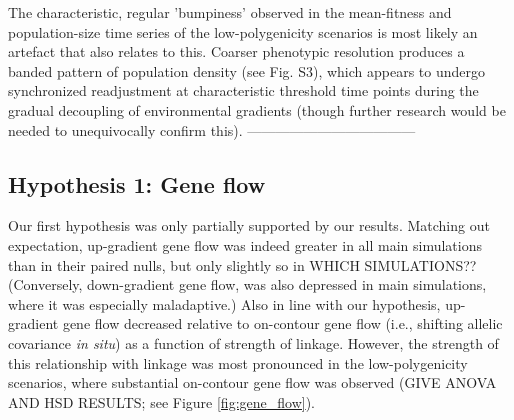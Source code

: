 \documentclass[9pt,twocolumn,twoside,lineno]{pnas-new}
\begin{document}
The characteristic, regular 'bumpiness' observed in the mean-fitness and population-size
time series of the low-polygenicity scenarios is most likely an artefact that also relates to this.
Coarser phenotypic resolution produces a banded pattern of population density
(see Fig. S3), which appears to undergo synchronized readjustment
at characteristic threshold time points during the gradual decoupling
of environmental gradients
(though further research would be needed to unequivocally confirm this).
------------------------------------




\subsection{Hypothesis 1: Gene flow}
Our first hypothesis was only partially supported by our results.
Matching out expectation, up-gradient gene flow was indeed greater in all main simulations than in their paired nulls,
but only slightly so in WHICH SIMULATIONS??
(Conversely, down-gradient gene flow, was also depressed in main simulations,
where it was especially maladaptive.)
Also in line with our hypothesis, up-gradient gene flow decreased relative to
on-contour gene flow (i.e., shifting allelic covariance \textit{in situ})
as a function of strength of linkage.
However, the strength of this relationship with linkage was most pronounced in the
low-polygenicity scenarios, where substantial on-contour gene flow was observed
(GIVE ANOVA AND HSD RESULTS; see Figure \ref{fig:gene_flow}).
\end{document}
